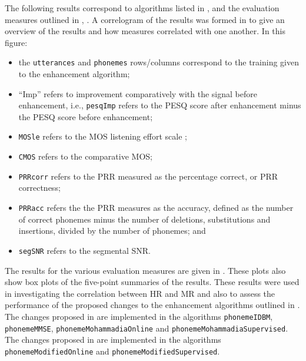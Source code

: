 The following results correspond to algorithms listed in ,
\textit{} and the evaluation measures outlined
in , \textit{}.
A correlogram of the results was formed in  to give
an overview of the results and how measures correlated with one another.
In this figure:
\begin{itemize}
\item the \lstinline!utterances! and \lstinline!phonemes! rows/columns
correspond to the training given to the enhancement algorithm;
\item ``Imp'' refers to improvement comparatively with the signal before
enhancement, i.e., \lstinline!pesqImp! refers to the \ac{PESQ} score
after enhancement minus the \ac{PESQ} score before enhancement;
\item \lstinline!MOSle! refers to the \ac{MOS} listening effort scale
\citep{InternationalTelecommunicationUnion1996};
\item \lstinline!CMOS! refers to the comparative \ac{MOS};
\item \lstinline!PRRcorr! refers to the \ac{PRR} measured as the percentage
correct, or \ac{PRR} correctness;
\item \lstinline!PRRacc! refers the the \ac{PRR} measures as the accuracy,
defined as the number of correct phonemes minus the number of deletions,
substitutions and insertions, divided by the number of phonemes; and
\item \lstinline!segSNR! refers to the segmental \ac{SNR}.
\end{itemize}
The results for the various evaluation measures are given in .
These plots also show box plots of the five-point summaries of the
results. These results were used in investigating the correlation
between \ac{HR} and \ac{MR} and also to assess the performance of
the proposed changes to the enhancement algorithms outlined in .
The changes proposed in  are implemented
in the algorithms \lstinline[breaklines=true]!phonemeIDBM!, \lstinline[breaklines=true]!phonemeMMSE!,
\lstinline[breaklines=true]!phonemeMohammadiaOnline! and \lstinline[breaklines=true]!phonemeMohammadiaSupervised!.
The changes proposed in  are implemented
in the algorithms \lstinline[breaklines=true]!phonemeModifiedOnline!
and \lstinline[breaklines=true]!phonemeModifiedSupervised!.


